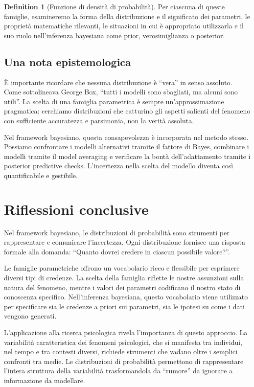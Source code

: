 \documentclass[
  letterpaper,
  DIV=11,
  numbers=noendperiod,
  oneside]{scrreprt}
\theoremstyle{definition}
\theoremstyle{plain}
\theoremstyle{definition}
\newtheorem{definition}{Definition}[chapter]
\theoremstyle{remark}
\begin{document}
\begin{definition}[Funzione di densità di
probabilità]
Per ciascuna di queste famiglie, esamineremo la forma della
distribuzione e il significato dei parametri, le proprietà matematiche
rilevanti, le situazioni in cui è appropriato utilizzarla e il suo ruolo
nell'inferenza bayesiana come prior, verosimiglianza o posterior.

\subsection{Una nota epistemologica}\label{una-nota-epistemologica}

È importante ricordare che nessuna distribuzione è ``vera'' in senso
assoluto. Come sottolineava George Box, ``tutti i modelli sono
sbagliati, ma alcuni sono utili''. La scelta di una famiglia parametrica
è sempre un'approssimazione pragmatica: cerchiamo distribuzioni che
catturino gli aspetti salienti del fenomeno con sufficiente accuratezza
e parsimonia, non la verità assoluta.

Nel framework bayesiano, questa consapevolezza è incorporata nel metodo
stesso. Possiamo confrontare i modelli alternativi tramite il fattore di
Bayes, combinare i modelli tramite il model averaging e verificare la
bontà dell'adattamento tramite i posterior predictive checks.
L'incertezza nella scelta del modello diventa così quantificabile e
gestibile.

\section*{Riflessioni conclusive}\label{riflessioni-conclusive-9}


Nel framework bayesiano, le distribuzioni di probabilità sono strumenti
per rappresentare e comunicare l'incertezza. Ogni distribuzione fornisce
una risposta formale alla domanda: ``Quanto dovrei credere in ciascun
possibile valore?''.

Le famiglie parametriche offrono un vocabolario ricco e flessibile per
esprimere diversi tipi di credenze. La scelta della famiglia riflette le
nostre assunzioni sulla natura del fenomeno, mentre i valori dei
parametri codificano il nostro stato di conoscenza specifico.
Nell'inferenza bayesiana, questo vocabolario viene utilizzato per
specificare sia le credenze a priori sui parametri, sia le ipotesi su
come i dati vengono generati.

L'applicazione alla ricerca psicologica rivela l'importanza di questo
approccio. La variabilità caratteristica dei fenomeni psicologici, che
si manifesta tra individui, nel tempo e tra contesti diversi, richiede
strumenti che vadano oltre i semplici confronti tra medie. Le
distribuzioni di probabilità permettono di rappresentare l'intera
struttura della variabilità trasformandola da ``rumore'' da ignorare a
informazione da modellare.


\end{definition}
\end{document}
